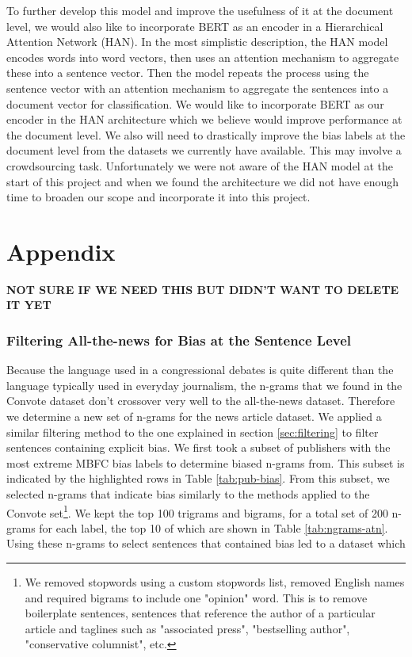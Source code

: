 \documentclass[10pt,a4paper,onecolumn]{article}
\begin{document}
To further develop this model and improve the usefulness of it at the document level, we would also like to incorporate BERT as an encoder in a Hierarchical Attention Network (HAN). In the most simplistic description, the HAN model encodes words into word vectors, then uses an attention mechanism to aggregate these into a sentence vector. Then the model repeats the process using the sentence vector with an attention mechanism to aggregate the sentences into a document vector for classification. We would like to incorporate BERT as our encoder in the HAN architecture which we believe would improve performance at the document level. We also will need to drastically improve the bias labels at the document level from the datasets we currently have available. This may involve a crowdsourcing task. Unfortunately we were not aware of the HAN model at the start of this project and when we found the architecture we did not have enough time to broaden our scope and incorporate it into this project.




\appendix
\section{Appendix}
\textbf{NOT SURE IF WE NEED THIS BUT DIDN'T WANT TO DELETE IT YET}
\subsubsection{Filtering All-the-news for Bias at the Sentence Level}
\label{sec:filtering2}
Because the language used in a congressional debates is quite different than the language typically used in everyday journalism, the n-grams that we found in the Convote dataset don't crossover very well to the all-the-news dataset. Therefore we determine a new set of n-grams for the news article dataset. We applied a similar filtering method to the one explained in section \ref{sec:filtering} to filter sentences containing explicit bias. We first took a subset of publishers with the most extreme MBFC bias labels to determine biased n-grams from. This subset is indicated by the highlighted rows in Table \ref{tab:pub-bias}. From this subset, we selected n-grams that indicate bias similarly to the methods applied to the Convote set\footnote{We removed stopwords using a custom stopwords list, removed English names and required bigrams to include one "opinion" word. This is to remove boilerplate sentences, sentences that reference the author of a particular article and taglines such as "associated press", "bestselling author", "conservative columnist", etc.}. We kept the top 100 trigrams and bigrams, for a total set of 200 n-grams for each label, the top 10 of which are shown in Table \ref{tab:ngrams-atn}. Using these n-grams to select sentences that contained bias led to a dataset which  
\end{document}
